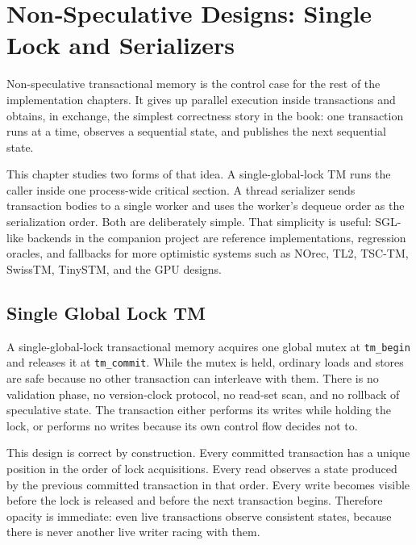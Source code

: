 \chapter{Non‑Speculative Designs: Single Lock and Serializers}

Non-speculative transactional memory is the control case for the rest of the implementation chapters. It gives up parallel execution inside transactions and obtains, in exchange, the simplest correctness story in the book: one transaction runs at a time, observes a sequential state, and publishes the next sequential state.

This chapter studies two forms of that idea. A single-global-lock TM runs the caller inside one process-wide critical section. A thread serializer sends transaction bodies to a single worker and uses the worker's dequeue order as the serialization order. Both are deliberately simple. That simplicity is useful: SGL-like backends in the companion project are reference implementations, regression oracles, and fallbacks for more optimistic systems such as NOrec, TL2, TSC-TM, SwissTM, TinySTM, and the GPU designs.

\section{Single Global Lock TM}

A single-global-lock transactional memory acquires one global mutex at \texttt{tm\_begin} and releases it at \texttt{tm\_commit}. While the mutex is held, ordinary loads and stores are safe because no other transaction can interleave with them. There is no validation phase, no version-clock protocol, no read-set scan, and no rollback of speculative state. The transaction either performs its writes while holding the lock, or performs no writes because its own control flow decides not to.

This design is correct by construction. Every committed transaction has a unique position in the order of lock acquisitions. Every read observes a state produced by the previous committed transaction in that order. Every write becomes visible before the lock is released and before the next transaction begins. Therefore opacity is immediate: even live transactions observe consistent states, because there is never another live writer racing with them.

